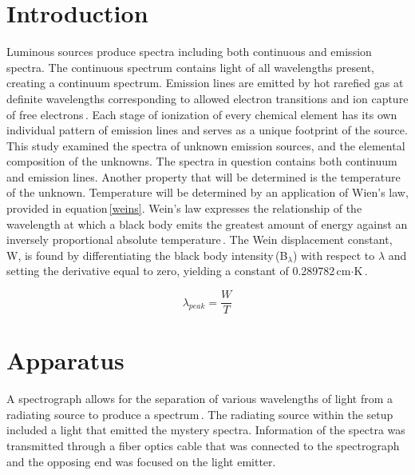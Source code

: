 \documentclass[twocolumn]{aastex6}
\begin{document}
\section{Introduction}
Luminous sources produce spectra including both continuous and emission spectra. The continuous spectrum contains light of all wavelengths present, creating a continuum spectrum. Emission lines are emitted by hot rarefied gas at definite wavelengths corresponding to allowed electron transitions and ion capture of free electrons\,\cite{1}. Each stage of ionization of every chemical element has its own individual pattern of emission lines and serves as a unique footprint of the source.
\\
\indent This study examined the spectra of unknown emission sources, and the elemental composition of the unknowns. The spectra in question contains both continuum and emission lines. Another property that will be determined is the temperature of the unknown. Temperature will be determined by an application of Wien's law, provided in equation\,\ref{weins}. Wein's law expresses the relationship of the wavelength at which a black body emits the greatest amount of energy against an inversely proportional absolute temperature\,\cite{1}. The Wein displacement constant, W, is found by differentiating the black body intensity\,(B$_{\lambda}$) with respect to $\lambda$ and setting the derivative equal to zero, yielding a constant of 0.289782\,cm$\cdot$K\,\cite{2}.

\begin{equation}
\lambda_{peak} = \frac{W}{T}
\label{weins}
\end{equation}



\section{Apparatus}


A spectrograph allows for the separation of various wavelengths of light from a radiating source to produce a spectrum\,\cite{1}. The radiating source within the setup included a light that emitted the mystery spectra. Information of the spectra was transmitted through a fiber optics cable that was connected to the spectrograph and the opposing end was focused on the light emitter.
\end{document}
